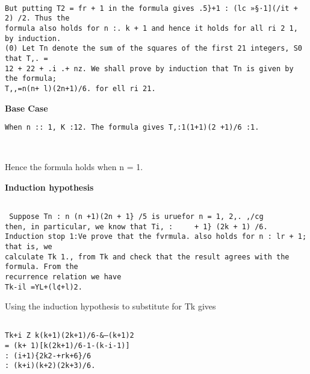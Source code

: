 \documentclass[]{article}
\begin{document}
\begin{verbatim}

But putting T2 = fr + 1 in the formula gives .5}+1 : (lc »§·1](/it + 2) /2. Thus the
formula also holds for n :. k + 1 and hence it holds for all ri 2 1, by induction.
(0) Let Tn denote the sum of the squares of the first 21 integers, S0 that T,. =
12 + 22 + .i .+ nz. We shall prove by induction that Tn is given by the formula;
T,,=n(n+ l)(2n+1)/6. for ell ri 21.
\end{verbatim}
\textbf{Base Case}
\begin{verbatim}
When n :: 1, K :12. The formula gives T,:1(1+1)(2 +1)/6 :1.



\end{verbatim}
Hence the formula holds when n = 1.

\textbf{Induction hypothesis}
\begin{verbatim}

 Suppose Tn : n (n +1)(2n + 1} /5 is uruefor n = 1, 2,. ,/cg
then, in particular, we know that Ti, :     + 1} (2k + 1) /6.
Induction stop 1:Ve prove that the fvrmula. also holds for n : lr + 1; that is, we
calculate Tk 1., from Tk and check that the result agrees with the formula. From the
recurrence relation we have
Tk-il =YL+(l¢+l)2.
\end{verbatim}
Using the induction hypothesis to substitute for Tk gives
\begin{verbatim}

Tk+i Z k(k+1)(2k+1)/6-&—(k+1)2
= (k+ 1)[k(2k+1)/6-1-(k-i-1)]
: (i+1){2k2-+rk+6}/6
: (k+i)(k+2)(2k+3)/6.
\end{verbatim}
\end{document}
